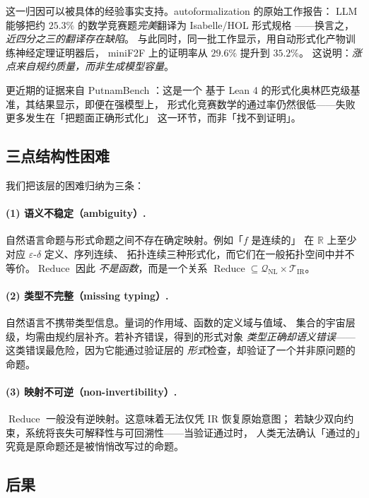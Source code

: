 \documentclass[UTF8,a4paper,11pt]{ctexart}
\newcommand{\NL}{\mathrm{NL}}
\newcommand{\IR}{\mathrm{IR}}
\DeclareMathOperator{\Reduce}{Reduce}
\begin{document}
这一归因可以被具体的经验事实支持。autoformalization 的原始工作报告：
LLM 能够把约 $25.3\%$ 的数学竞赛题\emph{完美}翻译为 Isabelle/HOL 形式规格
\citep{wu2022autoformalization}——换言之，\emph{近四分之三的翻译存在缺陷}。
与此同时，同一批工作显示，用自动形式化产物训练神经定理证明器后，
miniF2F \citep{zheng2022minif2f} 上的证明率从 $29.6\%$ 提升到 $35.2\%$。
这说明：\emph{涨点来自规约质量，而非生成模型容量}。

更近期的证据来自 PutnamBench \citep{tsoukalas2024putnambench}：这是一个
基于 Lean 4 的形式化奥林匹克级基准，其结果显示，即便在强模型上，
形式化竞赛数学的通过率仍然很低——失败更多发生在「把题面正确形式化」
这一环节，而非「找不到证明」。

\subsection{三点结构性困难}

我们把该层的困难归纳为三条：

\paragraph{(1) 语义不稳定（ambiguity）.}
自然语言命题与形式命题之间不存在确定映射。例如「$f$ 是连续的」
在 $\mathbb{R}$ 上至少对应 $\varepsilon$-$\delta$ 定义、序列连续、
拓扑连续三种形式化，而它们在一般拓扑空间中并不等价。$\Reduce$ 因此
\emph{不是函数}，而是一个关系 $\Reduce \subseteq \mathcal{Q}_{\NL} \times \mathcal{T}_{\IR}$。

\paragraph{(2) 类型不完整（missing typing）.}
自然语言不携带类型信息。量词的作用域、函数的定义域与值域、
集合的宇宙层级，均需由规约层补齐。若补齐错误，得到的形式对象
\emph{类型正确却语义错误}——这类错误最危险，因为它能通过验证层的
\emph{形式}检查，却验证了一个并非原问题的命题。

\paragraph{(3) 映射不可逆（non-invertibility）.}
$\Reduce$ 一般没有逆映射。这意味着无法仅凭 IR 恢复原始意图；
若缺少双向约束，系统将丧失可解释性与可回溯性——当验证通过时，
人类无法确认「通过的」究竟是原命题还是被悄悄改写过的命题。

\subsection{后果}
\end{document}
